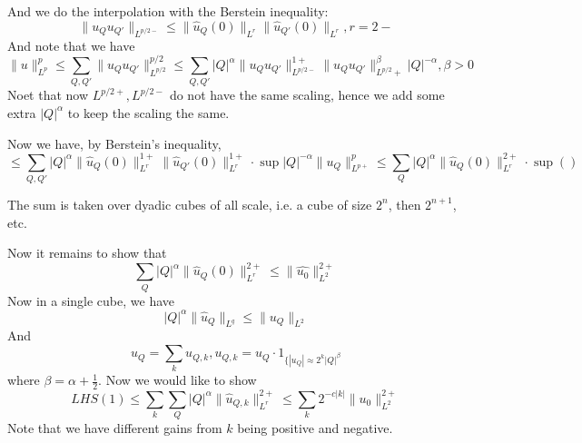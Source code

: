 And we do the interpolation with the Berstein inequality:
\begin{equation*}
    \|u_Qu_{Q'}\|_{L^{p/2-}}\leq\|\hat{u}_Q(0)\|_{L^r}\|\hat{u}_{Q'}(0)\|_{L^r}, r=2-    
\end{equation*}
And note that we have
\begin{equation*}
    \|u\|_{L^p}^p\leq\sum_{Q,Q'}\|u_Qu_{Q'}\|_{L^{p/2}}^{p/2}\leq\sum_{Q,Q'}|Q|^\alpha\|u_Qu_{Q'}\|_{L^{p/2-}}^{1+}\|u_Qu_{Q'}\|_{L^{p/2}+}^{\beta}|Q|^{-\alpha}, \beta>0
\end{equation*}
Noet that now $L^{p/2+}, L^{p/2-}$ do not have the same scaling, hence we add some extra $|Q|^\alpha$ to keep the scaling the same.

Now we have, by Berstein's inequality,
\begin{equation*}
    \leq\sum_{Q,Q'}|Q|^\alpha\|\hat{u}_{Q}(0)\|_{L^r}^{1+}\|\hat{u}_{Q'}(0)\|_{L^r}^{1+}\cdot\sup|Q|^{-\alpha}\|u_Q\|_{L^{p+}}^p\leq\sum_Q|Q|^\alpha\|\hat{u}_Q(0)\|_{L^r}^{2+}\cdot\sup()
\end{equation*}
\begin{note}
    The sum is taken over dyadic cubes of all scale, i.e. a cube of size $2^n$, then $2^{n+1}$, etc.
\end{note}
Now it remains to show that
\begin{equation*}
    \sum_Q|Q|^\alpha\|\hat{u}_Q(0)\|_{L^r}^{2+}\leq\|\hat{u_0}\|_{L^2}^{2+}
\end{equation*}
Now in a single cube, we have
\begin{equation*}
    |Q|^\alpha\|\hat{u}_Q\|_{L^q}\leq\|u_Q\|_{L^2}
\end{equation*}
And 
\begin{equation*}
    u_Q=\sum_ku_{Q,k}, u_{Q,k}=u_Q\cdot 1_{\{|u_Q|\approx 2^k|Q|^\beta}
\end{equation*}
where $\beta=\alpha+\frac{1}{2}$. Now we would like to show
\begin{equation*}
    LHS(1)\leq\sum_k\sum_Q|Q|^\alpha\|\hat{u}_{Q,k}\|_{L^r}^{2+}\leq\sum_k2^{-c|k|}\|u_0\|_{L^2}^{2+}
\end{equation*}
Note that we have different gains from $k$ being positive and negative.

